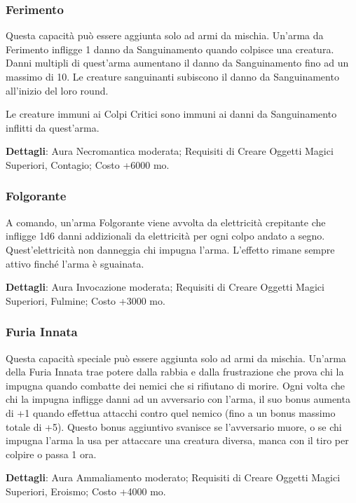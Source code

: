 \begin{multicols}{2}
	\subsubsection*{Ferimento}

	Questa capacità può essere aggiunta solo ad armi da mischia. Un'arma da Ferimento infligge 1 danno da Sanguinamento quando colpisce una creatura. Danni multipli di quest'arma aumentano il danno da Sanguinamento fino ad un massimo di 10.
	Le creature sanguinanti subiscono il danno da Sanguinamento all'inizio del loro round.

	Le creature immuni ai Colpi Critici sono immuni ai danni da Sanguinamento inflitti da quest'arma.

	\textbf{Dettagli}: Aura Necromantica moderata; Requisiti di Creare Oggetti Magici Superiori, Contagio; Costo +6000 mo.

	\subsubsection*{Folgorante}

	A comando, un'arma Folgorante viene avvolta da elettricità crepitante che infligge 1d6 danni addizionali da elettricità per ogni colpo andato a segno. Quest'elettricità non danneggia chi impugna l'arma. L'effetto rimane sempre attivo finché l'arma è sguainata.

	\textbf{Dettagli}: Aura Invocazione moderata; Requisiti di Creare Oggetti Magici Superiori, Fulmine; Costo +3000 mo.

	\subsubsection*{Furia Innata}

	Questa capacità speciale può essere aggiunta solo ad armi da mischia. Un'arma della Furia Innata trae potere dalla rabbia e dalla frustrazione che prova chi la impugna quando combatte dei nemici che si rifiutano di morire. Ogni volta che chi la impugna infligge danni ad un avversario con l'arma, il suo bonus aumenta di +1 quando effettua attacchi contro quel nemico (fino a un bonus massimo totale di +5). Questo bonus aggiuntivo svanisce se l'avversario muore, o se chi impugna l'arma la usa per attaccare una creatura diversa, manca con il tiro per colpire o passa 1 ora.

	\textbf{Dettagli}: Aura Ammaliamento moderato; Requisiti di Creare Oggetti Magici Superiori, Eroismo; Costo +4000 mo.


\end{multicols}
